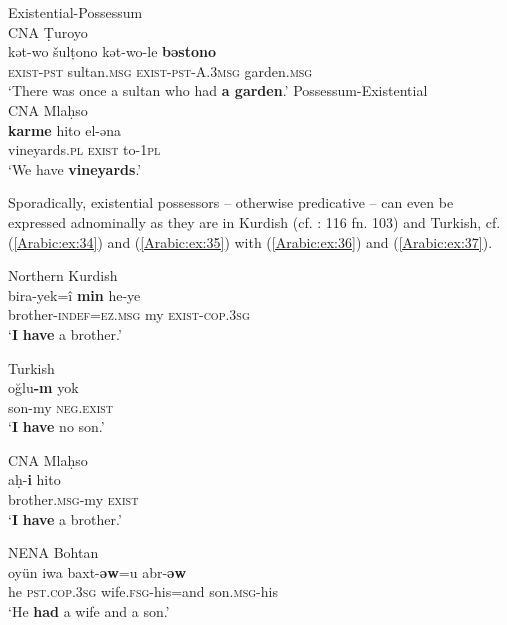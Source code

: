 \documentclass[output=paper,colorlinks,citecolor=brown,draftmode]{langscibook}
\begin{document}
\ea\label{Arabic:ex:33}
\ea\label{Arabic:ex:33a}
Existential-Possessum\\
CNA Ṭuroyo \citep[27:§1]{Ritter1967Turoyo} \\
\gll kət-wo šulṭono kət-wo-le \textbf{bəstono} \\
\textsc{exist-pst} sultan\textsc{.msg} \textsc{exist-pst-A.3msg} garden\textsc{.msg} \\
\glt `There was once a sultan who had \textbf{a garden}.' 
\ex\label{Arabic:ex:33b}
Possessum-Existential\\
CNA Mlaḥso \citep[§71]{Jastrow1994Mlahso} \\
\gll \textbf{karme} hito el-əna \\
vineyards\textsc{.pl} \textsc{exist} to\textsc{-1pl} \\
\glt `We have \textbf{vineyards}.'
\z
\z

Sporadically, existential possessors -- otherwise predicative -- can even be expressed adnominally as they are in Kurdish (cf. \citealt{Fox2009NABohtan}: 116 fn. 103) and Turkish, cf. (\ref{Arabic:ex:34}) and (\ref{Arabic:ex:35}) with (\ref{Arabic:ex:36}) and (\ref{Arabic:ex:37}).

\ea\label{Arabic:ex:34}
Northern Kurdish\\
\gll bira-yek=î \textbf{min} he-ye \\
brother\textsc{-indef=ez.msg} my \textsc{exist-cop.3sg} \\
\glt `\textbf{I} \textbf{have} a brother.'
\z

\ea\label{Arabic:ex:35}
Turkish\\
\gll oğlu\textbf{-m} yok \\
son-my \textsc{neg.exist} \\
\glt `\textbf{I} \textbf{have} no son.'
\z

\ea\label{Arabic:ex:36}
CNA Mlaḥso \citep[106.§12]{Jastrow1994Mlahso} \\
\gll aḥ-\textbf{i} hito \\
brother\textsc{.msg}-my \textsc{exist} \\
\glt `\textbf{I} \textbf{have} a brother.'
\z

\ea\label{Arabic:ex:37}
NENA Bohtan \citep[4.1:§1]{Fox2009NABohtan} \\
\gll oyün iwa baxt-\textbf{ǝw}=u abr-\textbf{ǝw} \\
he \textsc{pst.cop.3sg} wife\textsc{.fsg}-his=and son\textsc{.msg}-his \\
\glt `He \textbf{had} a wife and a son.'
\z
\end{document}
